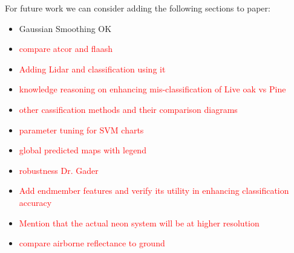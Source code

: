 \documentclass[remotesensing,article,accept,moreauthors,pdftex,12pt,a4paper]{mdpi}
\newcommand\red[1]{\textcolor{red}{#1}} %
\begin{document}
For future work we can consider adding the following sections to paper: 

\begin{itemize}
\item Gaussian Smoothing OK
\item \red{compare atcor and flaash}
\item \red{Adding Lidar and classification using it}
\item \red{knowledge reasoning on enhancing mis-classification of Live oak vs Pine}
\item \red{other cassification methods and their comparison diagrams}
\item \red{parameter tuning for SVM charts}
\item \red{global predicted maps with legend}
\item \red{robustness Dr. Gader}

\item \red{Add endmember features and verify its utility in enhancing classification accuracy}
\item \red{Mention that the actual neon system will be at higher resolution}
\item \red{compare airborne reflectance to ground}

\end{itemize}
\end{document}
